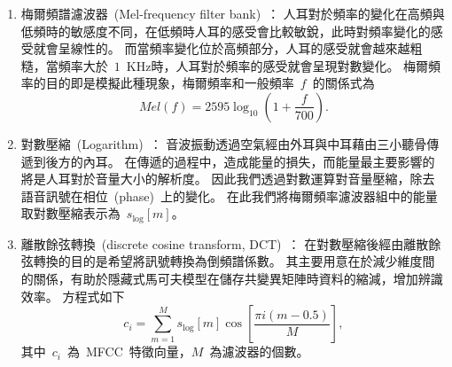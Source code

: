\begin{enumerate}
\item 梅爾頻譜濾波器~(Mel-frequency filter bank)~：
人耳對於頻率的變化在高頻與低頻時的敏感度不同，在低頻時人耳的感受會比較敏銳，此時對頻率變化的感受就會呈線性的。
而當頻率變化位於高頻部分，人耳的感受就會越來越粗糙，當頻率大於~$1$~KHz時，人耳對於頻率的感受就會呈現對數變化。
梅爾頻率的目的即是模擬此種現象，梅爾頻率和一般頻率~$f$~的關係式為
\begin{equation}
\label{eq:mel}
	Mel(f) = 2595 \log _{10} \left( 1 + \frac{f}{{700}} \right).
\end{equation}

\item 對數壓縮~(Logarithm)~：
音波振動透過空氣經由外耳與中耳藉由三小聽骨傳遞到後方的內耳。
在傳遞的過程中，造成能量的損失，而能量最主要影響的將是人耳對於音量大小的解析度。
因此我們透過對數運算對音量壓縮，除去語音訊號在相位~(phase)~上的變化。
在此我們將梅爾頻率濾波器組中的能量取對數壓縮表示為~$s_{\log}[m]$。

\item 離散餘弦轉換~(discrete cosine transform, DCT)~：
在對數壓縮後經由離散餘弦轉換的目的是希望將訊號轉換為倒頻譜係數。
其主要用意在於減少維度間的關係，有助於隱藏式馬可夫模型在儲存共變異矩陣時資料的縮減，增加辨識效率。
方程式如下
\begin{equation}
\label{eq:dct}
  c_i = \sum_{m=1}^{M} s_{\log}[m] \cos \left[ \frac{ \pi i \left( m-0.5 \right) }{M} \right],
\end{equation}
其中~$c_i$~為~MFCC~特徵向量，$M$~為濾波器的個數。
\end{enumerate}


